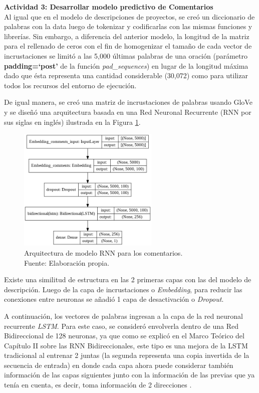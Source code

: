 \textbf{Actividad 3: Desarrollar modelo predictivo de Comentarios}
\\
Al igual que en el modelo de descripciones de proyectos, se creó un diccionario de palabras con la data luego de tokenizar y codificarlas con las mismas funciones y librerías. Sin embargo, a diferencia del anterior modelo, la longitud de la matriz para el rellenado de ceros con el fin de homogenizar el tamaño de cada vector de incrustaciones se limitó a las 5,000 últimas palabras de una oración (parámetro \textbf{padding=`post'} de la función \textit{pad\_sequences}) en lugar de la longitud máxima dado que ésta representa una cantidad considerable (30,072) como para utilizar todos los recursos del entorno de ejecución.

De igual manera, se creó una matriz de incrustaciones de palabras usando GloVe y se diseñó una arquitectura basada en una Red Neuronal Recurrente (RNN por sus siglas en inglés) ilustrada en la Figura \ref{4:fig36}.

\begin{figure}[!ht]
	\begin{center}
		\includegraphics[width=0.60\textwidth]{4/figures/model_rnn_comments.png}
		\caption[Arquitectura de modelo RNN para los comentarios]{Arquitectura de modelo RNN para los comentarios.\\
			Fuente: Elaboración propia.}
		\label{4:fig36}
	\end{center}
\end{figure}

Existe una similitud de estructura en las 2 primeras capas con las del modelo de descripción. Luego de la capa de incrustaciones o \textit{Embedding}, para reducir las conexiones entre neuronas se añadió 1 capa de desactivación o \textit{Dropout}.

A continuación, los vectores de palabras ingresan a la capa de la red neuronal recurrente \textit{LSTM}. Para este caso, se consideró envolverla dentro de una Red Bidireccional de 128 neuronas, ya que como se explicó en el Marco Teórico del Capítulo II sobre las RNN Bidireccionales, este tipo es una mejora de la LSTM tradicional al entrenar 2 juntas (la segunda representa una copia invertida de la secuencia de entrada) en donde cada capa ahora puede considerar también información de las capas siguientes junto con la información de las previas que ya tenía en cuenta, es decir, toma información de 2 direcciones \parencite{tec_brownlee2017bidirectional_lstm}.

